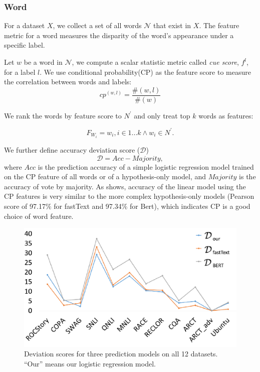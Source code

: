 \subsubsection{Word} For a dataset $X$, 
we collect a set of all words $\mathcal{N}$ that exist in $X$. 
The feature metric for a word measures the disparity of the word's appearance under 
 a specific label. 

Let $w$ be a word in $\mathcal{N}$, we compute a scalar statistic metric 
called {\em cue score}, $f^l$, for a label $l$. 
We use conditional probability(CP)
as the feature score to measure the correlation between words and labels: 
\begin{equation}
    cp^{(w,l)} = \frac{\#(w, l)}{\#(w)}
\end{equation}

We rank the words by feature score to $N^{'}$ and 
only treat top $k$ words as features:

\begin{equation}
    F_{W_i} = {w}_{i} , i \in 1...k \wedge w_{i} \in N^{'}.
\end{equation} 

We further define accuracy deviation score ($\mathcal{D}$)
\begin{equation}
    \mathcal{D} = {Acc} - {Majority},
\end{equation}
where $Acc$ is the prediction accuracy of a simple logistic regression
model trained on the CP feature of all words or of a hypothesis-only
model, and $Majority$ is the accuracy of vote by majority.
As  shows, accuracy of the linear model using 
the CP features is very similar to the more complex hypothesis-only models 
(Pearson score of 97.17\% for fastText and 97.34\% for Bert), 
which indicates CP is a good choice of word feature.

\begin{figure}[th]
\centering
\includegraphics[width=0.7\columnwidth]{picture/d_figure.pdf}
\caption{Deviation scores for three prediction models on all 12 datasets. 
``Our'' means our logistic regression model.}
\label{fig:d_figure}
\end{figure}

